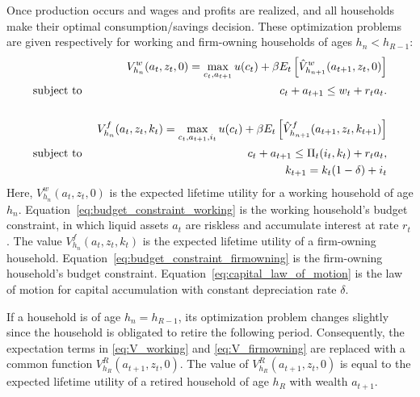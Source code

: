 \documentclass[11pt]{article}
\theoremstyle{definition}
\numberwithin{equation}{section}
\begin{document}
Once production occurs and wages and profits are realized, and all households make their optimal consumption/savings decision. These optimization problems are given respectively for working and firm-owning households of ages $h_n<h_{R-1}$:
\begin{eqnarray}
&& V^w_{h_n}(a_t,z_t,0) = \max_{c_t,a_{t+1}} u(c_t) + \beta E_t\left[ \hat{V}^w_{h_{n+1}}(a_{t+1},z_{t},0) \right] \label{eq:V_working} \\
\text{subject to } && c_t + a_{t+1} \leq w_t + r_t a_t. \label{eq:budget_constraint_working} \\
				   && \notag\\ 
&& V^f_{h_n}(a_t,z_t,k_t) = \max_{c_t,a_{t+1},i_t} u(c_t) + \beta E_t\left[ \hat{V}^f_{h_{n+1}}(a_{t+1},z_{t},k_{t+1}) \right] \label{eq:V_firmowning} \\
\text{subject to } && c_t + a_{t+1} \leq \Pi_t(i_t,k_t) + r_t a_t, \label{eq:budget_constraint_firmowning} \\
				   && k_{t+1} = k_t(1-\delta) + i_t \label{eq:capital_law_of_motion}
\end{eqnarray}
Here, $V^w_{h_n}(a_t,z_t,0)$ is the expected lifetime utility for a working household of age $h_n$. Equation~\eqref{eq:budget_constraint_working} is the working household's budget constraint, in which liquid assets $a_t$ are riskless and accumulate interest at rate $r_t$. The value $V^f_{h_n}(a_t,z_t,k_t)$ is the expected lifetime utility of a firm-owning household. Equation~\eqref{eq:budget_constraint_firmowning} is the firm-owning household's budget constraint. Equation~\eqref{eq:capital_law_of_motion} is the law of motion for capital accumulation with constant depreciation rate $\delta$.

If a household is of age $h_n=h_{R-1}$, its optimization problem changes slightly since the household is obligated to retire the following period. Consequently, the expectation terms in  \eqref{eq:V_working} and \eqref{eq:V_firmowning} are replaced with a common function $V^R_{h_R}(a_{t+1},z_t,0)$. The value of $V^R_{h_R}(a_{t+1},z_t,0)$ is equal to the expected lifetime utility of a retired household of age $h_R$ with wealth $a_{t+1}$. 
\end{document}
